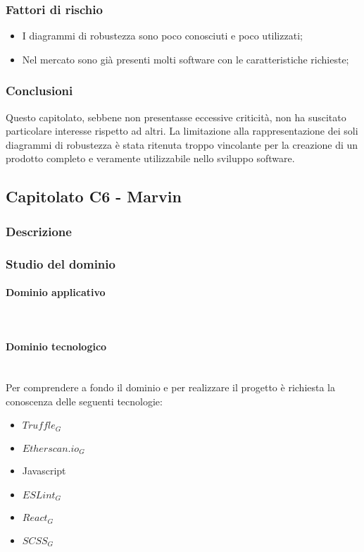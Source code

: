 		\subsubsection{Fattori di rischio}
		\begin{itemize}
			\item I diagrammi di robustezza sono poco conosciuti e poco utilizzati;
			\item Nel mercato sono già presenti molti software con le caratteristiche richieste;
		\end{itemize}
		\subsubsection{Conclusioni}
		Questo capitolato, sebbene non presentasse eccessive criticità, non ha suscitato particolare interesse rispetto ad altri. La limitazione alla rappresentazione dei soli diagrammi di robustezza è stata ritenuta troppo vincolante per la creazione di un prodotto completo e veramente utilizzabile nello sviluppo software.
		
		
	\subsection{Capitolato C6 - Marvin}
		\subsubsection{Descrizione}
		\subsubsection{Studio del dominio}
			\paragraph{Dominio applicativo}
			\mbox{}\\
			\paragraph{Dominio tecnologico}
			\mbox{}\\
			Per comprendere a fondo il dominio e per realizzare il progetto è richiesta la conoscenza delle seguenti tecnologie:
			\begin{itemize}
				\item $Truffle_G$
				\item $Etherscan.io_G$
				\item Javascript
				\item $ESLint_G$
				\item $React_G$
				\item $SCSS_G$
			\end{itemize}
